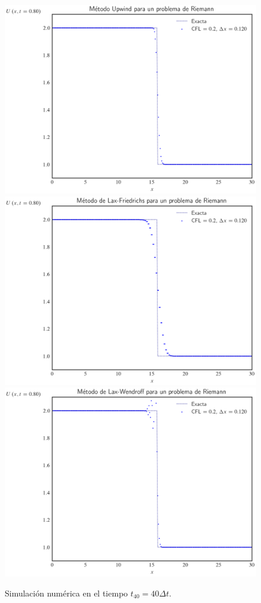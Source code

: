 \begin{figure}[ht!]
    \centering
    \includegraphics[width=.30\paperwidth]{../snapshots/upwindheaviside1d-40.png}
    \includegraphics[width=.30\paperwidth]{../snapshots/lax-friedrichsheaviside1d-40.png}
    \includegraphics[width=.30\paperwidth]{../snapshots/lax-wendroffheaviside1d-40.png}
    \caption{Simulación numérica en el tiempo $t_{40}=40\Delta t$.}
    \label{fig:example2t40}
\end{figure}

